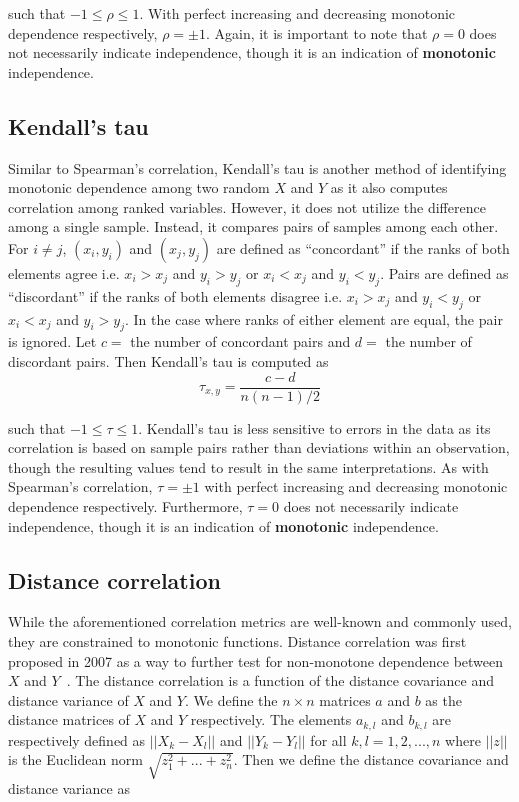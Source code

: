 \noindent such that $-1 \leq \rho \leq 1$. With perfect increasing and 
decreasing 
monotonic dependence respectively,
$\rho=\pm1$. Again, it is important to note that $\rho=0$ does not necessarily
indicate independence, though it is an indication of \textbf{monotonic}
independence.

\subsection{Kendall's tau}

Similar to Spearman's correlation, Kendall's tau is another method of
identifying monotonic dependence among two random $X$ and $Y$ as it also
computes correlation among ranked variables. However, it does not utilize the
difference among a single sample. Instead, it compares pairs of samples among
each other. For $i\not=j$, $(x_i,y_i)$ and $(x_j,y_j)$ are defined as
``concordant'' if the ranks of both elements agree i.e. $x_i > x_j$ and $y_i >
y_j$ or $x_i < x_j$ and $y_i < y_j$. Pairs are defined as ``discordant'' if the
ranks of both elements disagree i.e. $x_i > x_j$ and $y_i < y_j$ or $x_i < x_j$
and $y_i > y_j$. In the case where ranks of either element are equal, the pair
is ignored. Let $c=$ the number of concordant pairs and $d=$ the number of
discordant pairs. Then Kendall's tau is computed as 
$$\tau_{x,y}=\frac{c-d}{n(n-1)/2}$$

\noindent such that $-1 \leq \tau \leq 1$. Kendall's tau is less sensitive to 
errors in 
the data as its correlation is
based on sample pairs rather than deviations within an observation, though the
resulting values tend to result in the same interpretations. As with Spearman's
correlation, $\tau=\pm1$ with perfect increasing and decreasing monotonic
dependence respectively. Furthermore, $\tau=0$ does not necessarily indicate
independence, though it is an indication of \textbf{monotonic} independence.

\subsection{Distance correlation}

While the aforementioned correlation metrics are well-known and commonly used, 
they are constrained to monotonic functions. Distance correlation was first 
proposed in 2007 as a way to further test for non-monotone dependence between 
$X$ and $Y$~\cite{szekely2007}. The distance correlation is a function of the 
distance covariance and distance variance of $X$ and $Y$. We define the 
$n\times n$ matrices $a$ and $b$ as the distance matrices of $X$ and $Y$ 
respectively. The elements $a_{k,l}$ and $b_{k,l}$ are respectively defined as 
$||X_k-X_l||$ and $||Y_k-Y_l||$ for all $k,l=1,2,...,n$ where $||z||$ is the 
Euclidean norm $\sqrt{z_1^2+...+z_n^2}$. Then we define the distance covariance 
and distance variance as 


